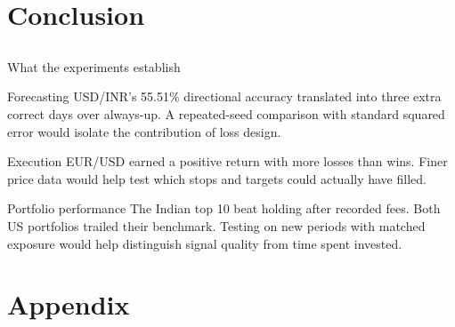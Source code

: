 \documentclass[aspectratio=169,10pt]{beamer}
\begin{document}
\section{Conclusion}
\subsection*{}
\begin{frame}{What the experiments establish}
\small
\begin{block}{Forecasting}
USD/INR's 55.51\% directional accuracy translated into three extra correct days over always-up. A repeated-seed comparison with standard squared error would isolate the contribution of loss design.
\end{block}
\begin{block}{Execution}
EUR/USD earned a positive return with more losses than wins. Finer price data would help test which stops and targets could actually have filled.
\end{block}
\begin{block}{Portfolio performance}
The Indian top 10 beat holding after recorded fees. Both US portfolios trailed their benchmark. Testing on new periods with matched exposure would help distinguish signal quality from time spent invested.
\end{block}
\end{frame}

\section{Appendix}
\end{document}
